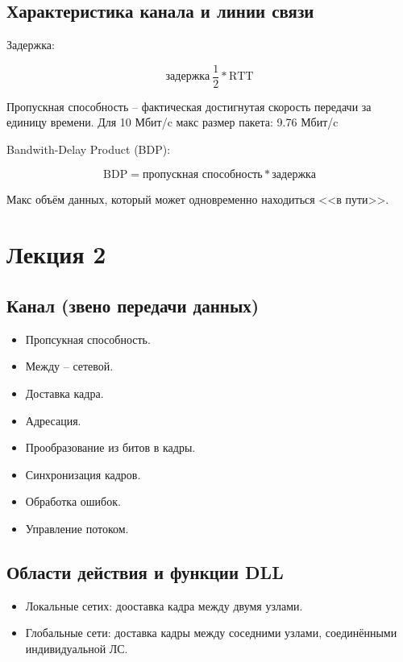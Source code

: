 \subsection{Характеристика канала и линии связи}

Задержка:

\[
\text{задержка} ~ \frac{1}{2} * \text{RTT}
\]

Пропускная способность – фактическая достигнутая скорость передачи за единицу времени. Для 10 Мбит/c макс размер пакета: 9.76 Мбит/c

Bandwith-Delay Product (BDP):

\[
\text{BDP} = \text{пропускная способность} * \text{задержка}
\]

Макс объём данных, который может одновременно находиться <<в пути>>.

\section{Лекция 2}
\subsection{Канал (звено передачи данных)}

\begin{itemize}
    \item Пропсукная способность.
    \item Между – сетевой.
\end{itemize}

\begin{itemize}
    \item Доставка кадра.
    \item Адресация.
    \item Прообразование из битов в кадры.
    \item Синхронизация кадров.
    \item Обработка ошибок.
    \item Управление потоком.
\end{itemize}

\subsection{Области действия и функции DLL}

\begin{itemize}
    \item Локальные сетих: дооставка кадра между двумя узлами.
    \item Глобальные сети: доставка кадры между соседними узлами, соединёнными индивидуальной ЛС.
\end{itemize}

